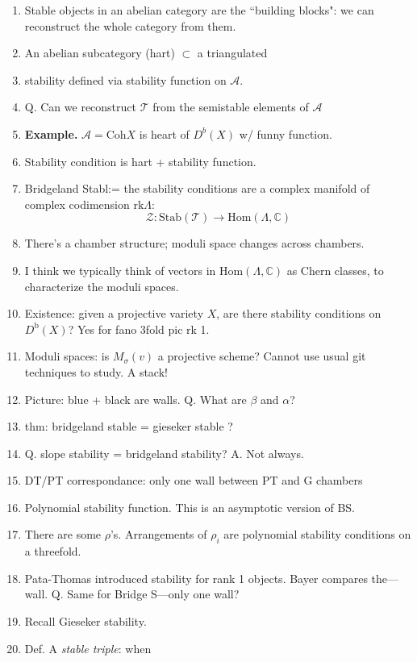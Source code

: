 \begin{enumerate}
\item Stable objects in an abelian category are the ``building blocks":
we can reconstruct the whole category from them.
\item  An abelian subcategory (hart) $\subset$ a triangulated
\item stability defined via stability function on $\mathcal{A}$.
\item Q. Can we reconstruct $\mathcal{T}$ from the semistable elements of
$\mathcal{A}$
\item {\bf Example.} $\mathcal{A}=\text{Coh}X$ is heart of $D^b(X)$
w/ funny function.
\item Stability condition is hart + stability function.
\item Bridgeland Stabl:= the stability conditions are a complex manifold
of complex codimension $\text{rk}\Lambda$:
$$
 \mathcal{Z}:\text{Stab}(\mathcal{T})
\longrightarrow \text{Hom}(\Lambda,\mathbb{C})
$$
\item There's a chamber structure; moduli space changes across chambers.
\item I think we typically think of vectors in $\text{Hom}(\Lambda,\mathbb{C})$ 
as Chern classes, to characterize the moduli spaces.
\item Existence: given a projective variety $X$, are there stability
conditions on $D^\text{b}(X)$? Yes for fano 3fold pic rk 1.
\item Moduli spaces: is $M_\sigma(v)$ a projective scheme? Cannot use
usual git techniques to study. A stack!
\item Picture: blue + black are walls. Q. What are $\beta$ and $\alpha$?
\item thm: bridgeland stable = gieseker stable ?
\item Q. slope stability = bridgeland stability? A. Not always.
\item DT/PT correspondance: only one wall between PT and G chambers
\medskip
\item Polynomial stability function. This is an asymptotic version of BS.
\item There are some $\rho$'s. Arrangements of $\rho_i$ are polynomial 
stability conditions on a threefold.
\item Pata-Thomas introduced stability for rank 1 objects.
Bayer compares the---wall. Q. Same for Bridge S---only one wall?
\item Recall Gieseker stability.
\medskip
\item Def. A {\it stable triple}: when

\end{enumerate}
